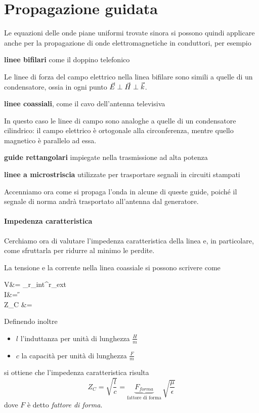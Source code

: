 \section{Propagazione guidata} \label{sec:propagazione_guidata}
Le equazioni delle onde piane uniformi trovate sinora si possono quindi applicare anche per la propagazione di onde elettromagnetiche in conduttori, per esempio
\begin{description}
	\item \textbf{linee bifilari} come il doppino telefonico

	Le linee di forza del campo elettrico nella linea bifilare sono simili a quelle di un condensatore, ossia in ogni punto $\vec{E}\perp\vec{H}\perp\vec{k}$.

	\item \textbf{linee coassiali}, come il cavo dell'antenna televisiva

	In questo caso le linee di campo sono analoghe a quelle di un condensatore cilindrico: il campo elettrico è ortogonale alla circonferenza, mentre quello magnetico è parallelo ad essa.

	\item \textbf{guide rettangolari} impiegate nella trasmissione ad alta potenza

	\item \textbf{linee a microstriscia} utilizzate per trasportare segnali in circuiti stampati
\end{description}
Accenniamo ora come si propaga l'onda in alcune di queste guide, poiché il segnale di norma andrà trasportato all'antenna dal generatore.

\paragraph{Impedenza caratteristica}
Cerchiamo ora di valutare l'impedenza caratteristica della linea e, in particolare, come sfruttarla per ridurre al minimo le perdite.

La tensione e la corrente nella linea coassiale si possono scrivere come
\begin{esp}
	V&= \int_{r_{int}}^{r_{ext}} \E \cdot \de {} \\
	I&= \oint \H \cdot \de {} \\
	\implies Z_C &=  
\end{esp}
Definendo inoltre
\begin{itemize}
	\item $l$ l'induttanza per unità di lunghezza $\frac{H}{m}$
	\item $c$ la capacità per unità di lunghezza $\frac{F}{m}$
\end{itemize}
si ottiene che l'impedenza caratteristica risulta
\begin{equation}
  Z_C = \sqrt{\frac{l}{c}} = \underbrace{F_{forma}}_{\text{fattore di forma}} \, \sqrt{\frac{\mu}{\epsilon}}
\end{equation}
dove $F$ è detto \emph{fattore di forma}.

